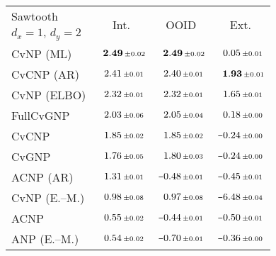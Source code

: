 \begin{tabular}[t]{lccc} 
\toprule 
Sawtooth & \multirow{2}{*}{Int.} & \multirow{2}{*}{OOID} & \multirow{2}{*}{Ext.} \\ 
$d_x\!=\!1,\,d_y\!=\!2$ \\ \midrule 
CvNP (ML) & $\hphantom{\scalebox{0.7}[1]{$-$}}\mathbf{2.49}\,{ \scriptstyle \pm  0.02 }$ & $\hphantom{\scalebox{0.7}[1]{$-$}}\mathbf{2.49}\,{ \scriptstyle \pm  0.02 }$ & $\hphantom{\scalebox{0.7}[1]{$-$}}0.05\,{ \scriptstyle \pm  0.01 }$ \\ 
CvCNP (AR) & $\hphantom{\scalebox{0.7}[1]{$-$}}2.41\,{ \scriptstyle \pm  0.01 }$ & $\hphantom{\scalebox{0.7}[1]{$-$}}2.40\,{ \scriptstyle \pm  0.01 }$ & $\hphantom{\scalebox{0.7}[1]{$-$}}\mathbf{1.93}\,{ \scriptstyle \pm  0.01 }$ \\ 
CvNP (ELBO) & $\hphantom{\scalebox{0.7}[1]{$-$}}2.32\,{ \scriptstyle \pm  0.01 }$ & $\hphantom{\scalebox{0.7}[1]{$-$}}2.32\,{ \scriptstyle \pm  0.01 }$ & $\hphantom{\scalebox{0.7}[1]{$-$}}1.65\,{ \scriptstyle \pm  0.01 }$ \\ 
FullCvGNP & $\hphantom{\scalebox{0.7}[1]{$-$}}2.03\,{ \scriptstyle \pm  0.06 }$ & $\hphantom{\scalebox{0.7}[1]{$-$}}2.05\,{ \scriptstyle \pm  0.04 }$ & $\hphantom{\scalebox{0.7}[1]{$-$}}0.18\,{ \scriptstyle \pm  0.00 }$ \\ 
CvCNP & $\hphantom{\scalebox{0.7}[1]{$-$}}1.85\,{ \scriptstyle \pm  0.02 }$ & $\hphantom{\scalebox{0.7}[1]{$-$}}1.85\,{ \scriptstyle \pm  0.02 }$ & $\scalebox{0.7}[1]{$-$}0.24\,{ \scriptstyle \pm  0.00 }$ \\ 
CvGNP & $\hphantom{\scalebox{0.7}[1]{$-$}}1.76\,{ \scriptstyle \pm  0.05 }$ & $\hphantom{\scalebox{0.7}[1]{$-$}}1.80\,{ \scriptstyle \pm  0.03 }$ & $\scalebox{0.7}[1]{$-$}0.24\,{ \scriptstyle \pm  0.00 }$ \\ 
ACNP (AR) & $\hphantom{\scalebox{0.7}[1]{$-$}}1.31\,{ \scriptstyle \pm  0.01 }$ & $\scalebox{0.7}[1]{$-$}0.48\,{ \scriptstyle \pm  0.01 }$ & $\scalebox{0.7}[1]{$-$}0.45\,{ \scriptstyle \pm  0.01 }$ \\ 
CvNP (E.--M.) & $\hphantom{\scalebox{0.7}[1]{$-$}}0.98\,{ \scriptstyle \pm  0.08 }$ & $\hphantom{\scalebox{0.7}[1]{$-$}}0.97\,{ \scriptstyle \pm  0.08 }$ & $\scalebox{0.7}[1]{$-$}6.48\,{ \scriptstyle \pm  0.04 }$ \\ 
ACNP & $\hphantom{\scalebox{0.7}[1]{$-$}}0.55\,{ \scriptstyle \pm  0.02 }$ & $\scalebox{0.7}[1]{$-$}0.44\,{ \scriptstyle \pm  0.01 }$ & $\scalebox{0.7}[1]{$-$}0.50\,{ \scriptstyle \pm  0.01 }$ \\ 
ANP (E.--M.) & $\hphantom{\scalebox{0.7}[1]{$-$}}0.54\,{ \scriptstyle \pm  0.02 }$ & $\scalebox{0.7}[1]{$-$}0.70\,{ \scriptstyle \pm  0.01 }$ & $\scalebox{0.7}[1]{$-$}0.36\,{ \scriptstyle \pm  0.00 }$ \\ 

\end{tabular}
